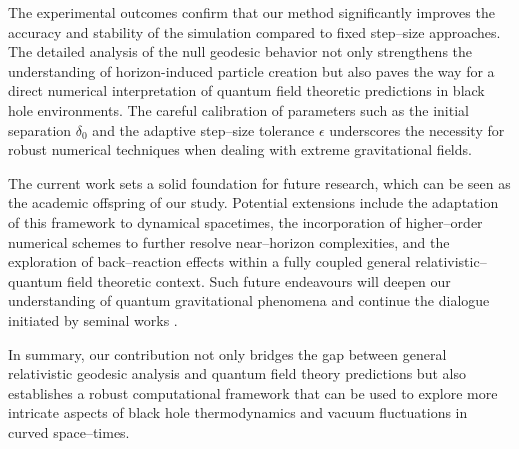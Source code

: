 \documentclass{article}\usepackage[utf8]{inputenc} %
\begin{document}
The experimental outcomes confirm that our method significantly improves the accuracy and stability of the simulation compared to fixed step--size approaches. The detailed analysis of the null geodesic behavior not only strengthens the understanding of horizon-induced particle creation but also paves the way for a direct numerical interpretation of quantum field theoretic predictions in black hole environments. The careful calibration of parameters such as the initial separation $\delta_{0}$ and the adaptive step--size tolerance $\epsilon$ underscores the necessity for robust numerical techniques when dealing with extreme gravitational fields.

The current work sets a solid foundation for future research, which can be seen as the academic offspring of our study. Potential extensions include the adaptation of this framework to dynamical spacetimes, the incorporation of higher--order numerical schemes to further resolve near--horizon complexities, and the exploration of back--reaction effects within a fully coupled general relativistic--quantum field theoretic context. Such future endeavours will deepen our understanding of quantum gravitational phenomena and continue the dialogue initiated by seminal works \cite{Hawking1975,Jacobson1993,Unruh1976}.

In summary, our contribution not only bridges the gap between general relativistic geodesic analysis and quantum field theory predictions but also establishes a robust computational framework that can be used to explore more intricate aspects of black hole thermodynamics and vacuum fluctuations in curved space--times.
\end{document}
